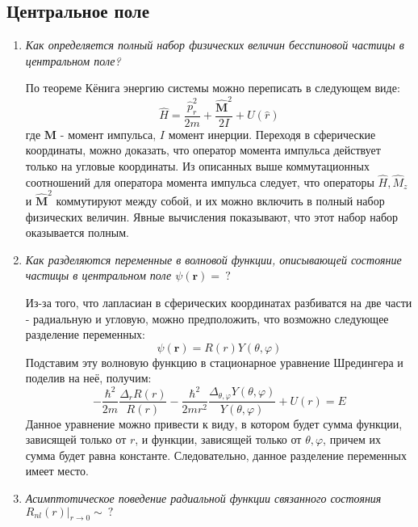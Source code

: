 \documentclass{article}
\begin{document}
\subsection*{Центральное поле}
	\begin{enumerate}
		\item \textit{Как определяется полный набор физических величин бесспиновой частицы в центральном поле?}
		
		По теореме Кёнига энергию системы можно переписать в следующем виде:
		\begin{equation}
			\hat{H} = \frac{\hat{p}_r^2}{2m} + \frac{\hat{\textbf{M}}^2}{2I} + U(\hat{r})
		\end{equation}
		где $\textbf{M}$ - момент импульса, $I$ момент инерции. Переходя в сферические координаты, можно доказать, что оператор момента импульса действует только на угловые координаты. Из описанных выше коммутационных соотношений для оператора момента импульса следует, что операторы $\hat{H}, \hat{M}_z$ и $\hat{\textbf{M}}^2$ коммутируют между собой, и их можно включить в полный набор физических величин. Явные вычисления показывают, что этот набор набор оказывается полным.
		 
		 \item \textit{Как разделяются переменные в волновой функции, описывающей состояние частицы в центральном поле $\psi(\textbf{r}) = \ ?$}
		 
		 Из-за того, что лапласиан в сферических координатах разбиватся на две части - радиальную и угловую, можно предположить, что возможно следующее разделение переменных:
		 \begin{equation}
		 	\psi(\textbf{r}) = R(r)Y(\theta,\varphi)
		 \end{equation}
		 Подставим эту волновую функцию в стационарное уравнение Шредингера и поделив на неё, получим:
		 \begin{equation}
		 	-\frac{\hbar^2}{2m} \frac{\Delta_r R(r)}{R(r)} - \frac{\hbar^2}{2mr^2}\frac{\Delta_{\theta,\varphi} Y(\theta, \varphi)}{Y(\theta, \varphi)} + U(r) = E
		 \end{equation}
		 Данное уравнение можно привести к виду, в котором будет сумма функции, зависящей только от $r$, и функции, зависящей только от $\theta,\varphi$, причем их сумма будет равна константе. Следовательно, данное разделение переменных имеет место.
		 
		 \item \textit{Асимптотическое поведение радиальной функции связанного состояния $\left.R_{nl}(r)\right|_{r \to 0} \sim \ ?$}
		 

\end{enumerate}
\end{document}
